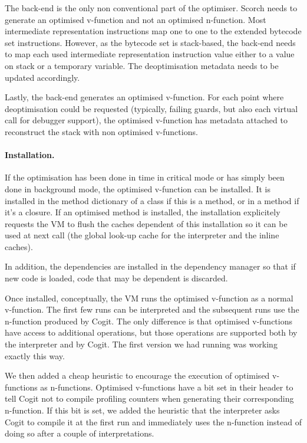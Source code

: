 \documentclass[a4paper,12pt,twoside]{../includes/ThesisStyle}
\begin{document}
The back-end is the only non conventional part of the optimiser. Scorch needs to generate an optimised v-function and not an optimised n-function. Most intermediate representation instructions map one to one to the extended bytecode set instructions. However, as the bytecode set is stack-based, the back-end needs to map each used intermediate representation instruction value either to a value on stack or a temporary variable. The deoptimisation metadata needs to be updated accordingly.

Lastly, the back-end generates an optimised v-function. For each point where deoptimisation could be requested (typically, failing guards, but also each virtual call for debugger support), the optimised v-function has metadata attached to reconstruct the stack with non optimised v-functions.

\paragraph{Installation.}
If the optimisation has been done in time in critical mode or has simply been done in background mode, the optimised v-function can be installed. It is installed in the method dictionary of a class if this is a method, or in a method if it's a closure. If an optimised method is installed, the installation explicitely requests the VM to flush the caches dependent of this installation so it can be used at next call (the global look-up cache for the interpreter and the inline caches).

In addition, the dependencies are installed in the dependency manager so that if new code is loaded, code that may be dependent is discarded.

Once installed, conceptually, the VM runs the optimised v-function as a normal v-function. The first few runs can be interpreted and the subsequent runs use the n-function produced by Cogit. The only difference is that optimised v-functions have access to additional operations, but those operations are supported both by the interpreter and by Cogit. The first version we had running was working exactly this way.

We then added a cheap heuristic to encourage the execution of optimised v-functions as n-functions. Optimised v-functions have a bit set in their header to tell Cogit not to compile profiling counters when generating their corresponding n-function. If this bit is set, we added the heuristic that the interpreter asks Cogit to compile it at the first run and immediately uses the n-function instead of doing so after a couple of interpretations.
\end{document}

